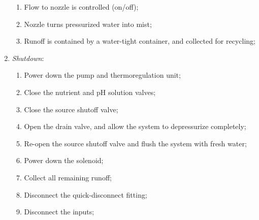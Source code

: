 \begin{enumerate}
\begin{enumerate}
        \item Flow to nozzle is controlled (on/off);
        \item Nozzle turns pressurized water into mist;
        \item Runoff is contained by a water-tight container, and collected for recycling;
    \end{enumerate}
    \item \textit{Shutdown}:
    \begin{enumerate}
        \item Power down the pump and thermoregulation unit;
        \item Close the nutrient and pH solution valves;
        \item Close the source shutoff valve;
        \item Open the drain valve, and allow the system to depressurize completely;
        \item Re-open the source shutoff valve and flush the system with fresh water;
        \item Power down the solenoid;
        \item Collect all remaining runoff;
        \item Disconnect the quick-disconnect fitting;
        \item Disconnect the inputs;
    \end{enumerate}
\end{enumerate}

